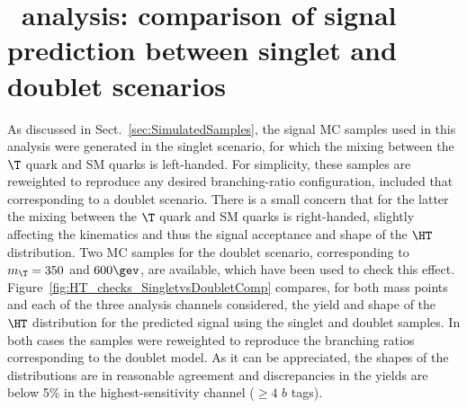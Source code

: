 \clearpage{\pagestyle{empty}\cleardoublepage}

\chapter{\htx\ analysis: comparison of signal prediction between singlet and doublet scenarios}
\label{app:SingletvsDoublet}

As discussed in Sect.~\ref{sec:SimulatedSamples}, the signal MC samples used in this analysis were
generated in the singlet scenario, for which the mixing between the $\T$ quark and SM quarks is left-handed.
For simplicity, these samples are reweighted to reproduce any desired branching-ratio configuration, included
that corresponding to a doublet scenario. There is a small concern that for the latter the mixing between the $\T$
quark and SM quarks is right-handed, slightly affecting the kinematics and thus the signal acceptance and shape
of the $\HT$ distribution. Two MC samples for the doublet scenario, corresponding to $m_{\T}=350$ and $600\gev$, are available, which
have been used to check this effect. Figure~\ref{fig:HT_checks_SingletvsDoubletComp} compares, for both mass
points and each of the three analysis channels considered, the yield and shape of the $\HT$ distribution for the 
predicted signal using the singlet and doublet samples. In both cases the samples were reweighted to reproduce
the branching ratios corresponding to the doublet model. As it can be appreciated, the shapes of the distributions
are in reasonable agreement and discrepancies in the yields are below 5\% in the highest-sensitivity channel ($\geq 4$ $b$ tags).

